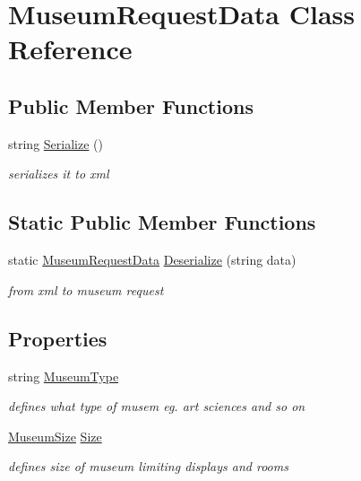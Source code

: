 \hypertarget{class_museum_request_data}{}\section{Museum\+Request\+Data Class Reference}
\label{class_museum_request_data}
\subsection*{Public Member Functions}
\begin{DoxyCompactItemize}
\item 
string \mbox{\hyperlink{class_museum_request_data_ac2ab3cbc8d51ee55b5b23fe2cf9e93f3}{Serialize}} ()
\begin{DoxyCompactList}\small\item\em serializes it to xml \end{DoxyCompactList}\end{DoxyCompactItemize}
\subsection*{Static Public Member Functions}
\begin{DoxyCompactItemize}
\item 
static \mbox{\hyperlink{class_museum_request_data}{Museum\+Request\+Data}} \mbox{\hyperlink{class_museum_request_data_a927b5c1b4ac92161315f7bb717b7c6e6}{Deserialize}} (string data)
\begin{DoxyCompactList}\small\item\em from xml to museum request \end{DoxyCompactList}\end{DoxyCompactItemize}
\subsection*{Properties}
\begin{DoxyCompactItemize}
\item 
string \mbox{\hyperlink{class_museum_request_data_a2b68f4ddd18c2d01fcd44a02a135b58b}{Museum\+Type}}
\begin{DoxyCompactList}\small\item\em defines what type of musem eg. art sciences and so on \end{DoxyCompactList}\item 
\mbox{\hyperlink{_mueseum_request_data_8cs_a462fa84e99cf703318040e54f14146a2}{Museum\+Size}} \mbox{\hyperlink{class_museum_request_data_a8c9489791297c88de3c37c0fe340858d}{Size}}
\begin{DoxyCompactList}\small\item\em defines size of museum limiting displays and rooms \end{DoxyCompactList}\end{DoxyCompactItemize}


